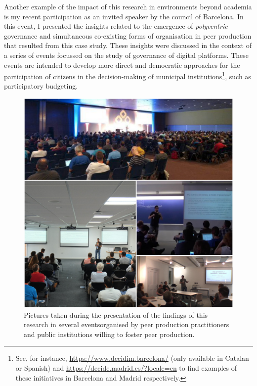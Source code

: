 Another example of the impact of this research in environments beyond academia is my recent participation \parencite{decidim-bcn:2017:Online} as an invited speaker by the council of Barcelona. In this event, I presented the insights related to the emergence of \textit{polycentric} governance and simultaneous co-existing forms of organisation in peer production that resulted from this case study. These insights were discussed in the context of a series of events focussed on the study of governance of digital platforms. These events are intended to develop more direct and democratic approaches for the participation of citizens in the decision-making of municipal institutions\footnote{See, for instance, \url{https://www.decidim.barcelona/} (only available in Catalan or Spanish) and \url{https://decide.madrid.es/?locale=en} to find examples of these initiatives in Barcelona and Madrid respectively.}, such as participatory budgeting.

\begin{figure}[H]
    \centering
\includegraphics[scale=0.35]{img/events/drozas_events_several.jpg}
    \caption[Pictures taken during the presentation of the findings of this research in several events]%
    {Pictures taken during the presentation of the findings of this research in several events\protect\footnotemark organised by peer production practitioners and public institutions willing to foster peer production.}
    \label{drozas_events}
\end{figure}


